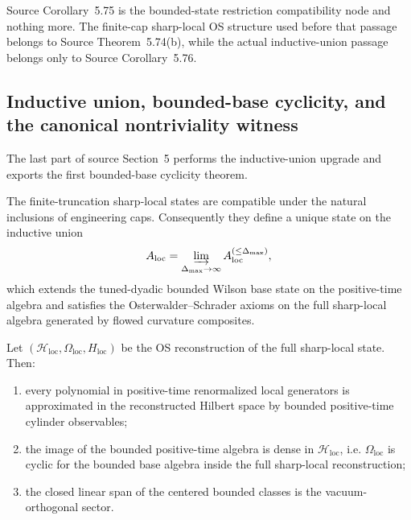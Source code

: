 \begin{remark}
Source Corollary~5.75 is the bounded-state restriction compatibility node and nothing more. The finite-cap sharp-local OS structure used before that passage belongs to Source Theorem~5.74(b), while the actual inductive-union passage belongs only to Source Corollary~5.76.
\end{remark}

\subsection{Inductive union, bounded-base cyclicity, and the canonical nontriviality witness}
The last part of source Section~5 performs the inductive-union upgrade and exports the first bounded-base cyclicity theorem.

\begin{corollary}
The finite-truncation sharp-local states are compatible under the natural inclusions of engineering caps. Consequently they define a unique state on the inductive union
\[
A_{\mathrm{loc}}=\varinjlim_{\Delta_{\max}\to\infty}A_{\mathrm{loc}}^{(\le \Delta_{\max})},
\]
which extends the tuned-dyadic bounded Wilson base state on the positive-time algebra and satisfies the Osterwalder--Schrader axioms on the full sharp-local algebra generated by flowed curvature composites.
\end{corollary}

\begin{theorem}
Let $(\mathcal H_{\mathrm{loc}},\Omega_{\mathrm{loc}},H_{\mathrm{loc}})$ be the OS reconstruction of the full sharp-local state. Then:
\begin{enumerate}[label=(\roman*),leftmargin=2.2em]
\item every polynomial in positive-time renormalized local generators is approximated in the reconstructed Hilbert space by bounded positive-time cylinder observables;
\item the image of the bounded positive-time algebra is dense in $\mathcal H_{\mathrm{loc}}$, i.e. $\Omega_{\mathrm{loc}}$ is cyclic for the bounded base algebra inside the full sharp-local reconstruction;
\item the closed linear span of the centered bounded classes is the vacuum-orthogonal sector.
\end{enumerate}
\end{theorem}


